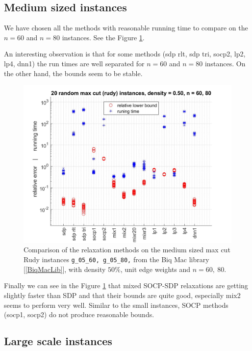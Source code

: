 \documentclass[12pt]{book}
\theoremstyle{definition}
\begin{document}
\subsection{Medium sized instances}

We have chosen all the methods with reasonable running time to compare on the $n=60$ and $n=80$ instances. See the Figure \ref{comp1}.

An interesting observation is that for some methods (sdp rlt, sdp tri, socp2, lp2, lp4, dnn1) the run times are well separated for $n=60$ and $n=80$ instances. On the other hand, the bounds seem to be stable.
\begin{center}
\begin{figure}
\includegraphics[scale=0.27]{img/comp1.jpg}
\caption[Comparison of relaxations - medium, dense instances of max cut]{Comparison of the relaxation methods on the medium sized max cut Rudy instances {\tt g\_05\_60, g\_05\_80,} from the Biq Mac library [\ref{BiqMacLib}], with density  $50\%$, unit edge weights and $n=60,\ 80$.} 
\label{comp1}
\end{figure}
\end{center}

Finally we can see in the Figure \ref{comp1} that mixed SOCP-SDP relaxations are getting slightly faster than SDP and that their bounds are quite good, especially mix2 seems to perform very well. 
Similar to the small instances, SOCP methods (socp1, socp2) do not produce reasonable bounds. 


\subsection{Large scale instances}
\end{document}

